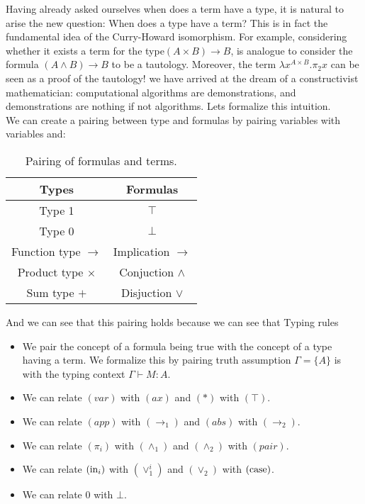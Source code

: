 Having already asked ourselves when does a term have a type, it is natural to arise the new question: When does a type have a term? This is in fact the fundamental idea of the Curry-Howard isomorphism. For example, considering whether it exists a term for the type$(A \times B) \to B$, is analogue to consider the formula $(A\land B)\to B$ to be a tautology. Moreover, the term $\lambda x^{A\times B}. \pi_2 x$ can be seen as a proof of the tautology! we have arrived at the dream of a constructivist mathematician: computational algorithms are demonstrations, and demonstrations are nothing if not algorithms. Lets formalize this intuition.\\


We can create a pairing between type and formulas by pairing variables with variables and:
\begin{table}[!h]
\begin{center}
\begin{tabular}{c|c}
  Types  & Formulas  \\
  \hline
  Type 1 & $\top$ \\
  Type 0 & $\bot$ \\
  Function type $\to$   & Implication $\to$  \\
  Product type $\times$ & Conjuction $\land$ \\
  Sum type $+$     & Disjuction $\lor$ \\

\end{tabular}
\caption*{\label{tab:table-name} Pairing of formulas and terms.}
\end{center}
\end{table}

And we can see that this pairing holds because we can see that Typing rules 

\begin{itemize}
\item We pair the concept of a formula being true with the concept of a type having a term. We formalize this by pairing truth assumption $\Gamma=\{A\}$ is with the typing context $\Gamma\vdash M:A$. 
\item We can relate $(var)$ with $(ax)$ and $(*)$ with $(\top)$.
\item We can relate $(app)$ with $(\to_1)$ and $(abs)$ with $(\to_2)$.
\item We can relate $(\pi_i)$ with $(\land_1)$ and $(\land_2)$ with $(pair)$.
\item We can relate $(\operatorname{in}_i)$ with $(\lor_1^i)$ and $(\lor_2)$ with $(\operatorname{case})$.
\item We can relate $0$ with $\bot$.
\end{itemize}


